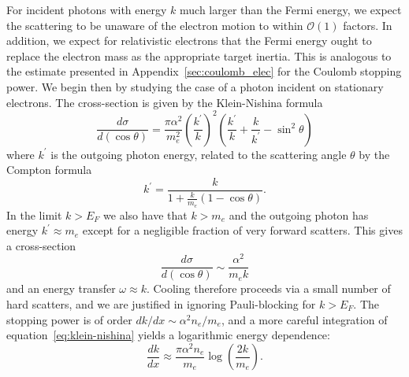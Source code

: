 \documentclass[twocolumn, preprintnumbers,amsmath,amssymb,prd, superscriptaddress]{revtex4}
\newcommand{\OO}{\mathcal{O}}
\def\r{\right)}
\def\l{\left(}
\begin{document}
\begin{appendices}
For incident photons with energy $k$ much larger than the Fermi energy, we expect the scattering to be unaware of the electron motion to within $\OO(1)$ factors. 
In addition, we expect for relativistic electrons that the Fermi energy ought to replace the electron mass as the appropriate target inertia. 
This is analogous to the estimate presented in Appendix~\ref{sec:coulomb_elec} for the Coulomb stopping power.
We begin then by studying the case of a photon incident on stationary electrons. 
The cross-section is given by the Klein-Nishina formula
\begin{equation}
\label{eq:klein-nishina}
  \frac{d\sigma}{d (\cos \theta)} = \frac{\pi \alpha^2}{m_e^2}
  \l \frac{k^\prime}{k} \r^2
  \l \frac{k^\prime}{k} + \frac{k}{k^\prime} -\sin^2 \theta \r
\end{equation}
where $k^\prime$ is the outgoing photon energy, related to the scattering angle $\theta$ by the Compton formula
\begin{equation}
{k^{\prime }={\frac {k}{1+{\frac {k}{m_e}}(1-\cos \theta )}}}.
\end{equation}
In the limit $k > E_F$ we also have that $k > m_e$ and the outgoing photon has energy $k^\prime \approx m_e$ except for a negligible fraction of very forward scatters. 
This gives a cross-section 
\begin{equation}
  \frac{d\sigma}{d (\cos \theta)} \sim \frac{\alpha^2}{m_e k}
\end{equation}
and an energy transfer $\omega \approx k$.
Cooling therefore proceeds via a small number of hard scatters, and we are justified in ignoring Pauli-blocking for $k > E_F$.
The stopping power is of order $dk/dx \sim \alpha^2 n_e/m_e$, and a more careful integration of equation~\eqref{eq:klein-nishina} yields a logarithmic energy dependence: 
\begin{equation}
\label{eq:approx-comptonSP}
  \frac{dk}{dx} \approx \frac{\pi \alpha^2 n_e}{m_e} \log\l\frac{2k}{m_e}\r.
\end{equation}


\end{appendices}
\end{document}
